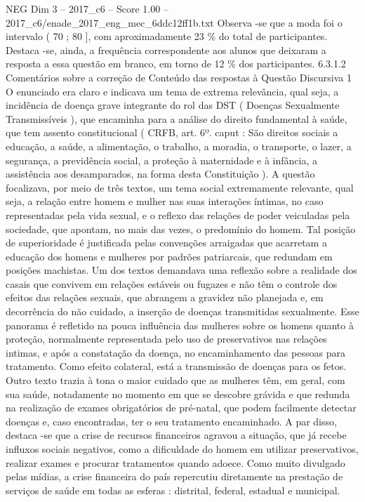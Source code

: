 \begin{textsample}{NEG Dim 3 – 2017\_c6 – Score 1.00 – 2017\_c6/enade\_2017\_eng\_mec\_6ddc12ff1b.txt}
Observa -se que a moda foi o intervalo ( 70 ; 80 ], com aproximadamente 23 \% do total de participantes.
Destaca -se, ainda, a frequência correspondente aos alunos que deixaram a resposta a essa questão em branco, em torno de 12 \% dos participantes. 6.3.1.2 Comentários sobre a correção de Conteúdo das respostas à Questão Discursiva 1 O enunciado era claro e indicava um tema de extrema relevância, qual seja, a incidência de doença grave integrante do rol das DST ( Doenças Sexualmente Transmissíveis ), que encaminha para a análise do direito fundamental à saúde, que tem assento constitucional ( CRFB, art. 6º. caput : São direitos sociais a educação, a saúde, a alimentação, o trabalho, a moradia, o transporte, o lazer, a segurança, a previdência social, a proteção à maternidade e à infância, a assistência aos desamparados, na forma desta Constituição ).
A questão focalizava, por meio de três textos, um tema social extremamente relevante, qual seja, a relação entre homem e mulher nas suas interações íntimas, no caso representadas pela vida sexual, e o reflexo das relações de poder veiculadas pela sociedade, que apontam, no mais das vezes, o predomínio do homem.
Tal posição de superioridade é justificada pelas convenções arraigadas que acarretam a educação dos homens e mulheres por padrões patriarcais, que redundam em posições machistas.
Um dos textos demandava uma reflexão sobre a realidade dos casais que convivem em relações estáveis ou fugazes e não têm o controle dos efeitos das relações sexuais, que abrangem a gravidez não planejada e, em decorrência do não cuidado, a inserção de doenças transmitidas sexualmente.
Esse panorama é refletido na pouca influência das mulheres sobre os homens quanto à proteção, normalmente representada pelo uso de preservativos nas relações intimas, e após a constatação da doença, no encaminhamento das pessoas para tratamento.
Como efeito colateral, está a transmissão de doenças para os fetos.
Outro texto trazia à tona o maior cuidado que as mulheres têm, em geral, com sua saúde, notadamente no momento em que se descobre grávida e que redunda na realização de exames obrigatórios de pré-natal, que podem facilmente detectar doenças e, caso encontradas, ter o seu tratamento encaminhado.
A par disso, destaca -se que a crise de recursos financeiros agravou a situação, que já recebe influxos sociais negativos, como a dificuldade do homem em utilizar preservativos, realizar exames e procurar tratamentos quando adoece.
Como muito divulgado pelas mídias, a crise financeira do país repercutiu diretamente na prestação de serviços de saúde em todas as esferas : distrital, federal, estadual e municipal.

\end{textsample}
